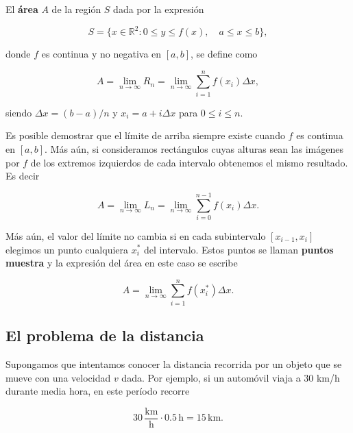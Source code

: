\documentclass[
  letterpaper,
]{book}
\theoremstyle{plain}
\theoremstyle{remark}
\begin{document}
\begin{tcolorbox}[enhanced jigsaw, opacityback=0, left=2mm, opacitybacktitle=0.6, toprule=.15mm, bottomrule=.15mm, colbacktitle=quarto-callout-note-color!10!white, titlerule=0mm, bottomtitle=1mm, title=\textcolor{quarto-callout-note-color}{\faInfo}\hspace{0.5em}{Definición (Área)}, toptitle=1mm, colframe=quarto-callout-note-color-frame, colback=white, breakable, rightrule=.15mm, arc=.35mm, leftrule=.75mm, coltitle=black]

El \textbf{área} \(A\) de la región \(S\) dada por la expresión

\[
S=\{x\in\mathbb{R}^2: 0\leq y\leq f(x),\quad a\leq x\leq b\},
\]

donde \(f\) es continua y no negativa en \([a,b]\), se define como

\[
A=\lim_{n\to \infty} R_n=\lim_{n\to \infty} \sum_{i=1}^n f(x_i)\Delta x,
\]

siendo \(\Delta x=(b-a)/n\) y \(x_i=a+i\Delta x\) para
\(0\leq i\leq n\).

\end{tcolorbox}

Es posible demostrar que el límite de arriba siempre existe cuando \(f\)
es continua en \([a,b]\). Más aún, si consideramos rectángulos cuyas
alturas sean las imágenes por \(f\) de los extremos izquierdos de cada
intervalo obtenemos el mismo resultado. Es decir

\[
A=\lim_{n\to \infty} L_n=\lim_{n\to \infty} \sum_{i=0}^{n-1} f(x_i)\Delta x.
\]

Más aún, el valor del límite no cambia si en cada subintervalo
\([x_{i-1},x_i]\) elegimos un punto cualquiera \(x_i^*\) del intervalo.
Estos puntos se llaman \textbf{puntos muestra} y la expresión del área
en este caso se escribe

\[
A=\lim_{n\to \infty} \sum_{i=1}^{n} f(x_i^*)\Delta x.
\]

\subsection{El problema de la
distancia}\label{el-problema-de-la-distancia}

Supongamos que intentamos conocer la distancia recorrida por un objeto
que se mueve con una velocidad \(v\) dada. Por ejemplo, si un automóvil
viaja a \(30\) km/h durante media hora, en este período recorre

\[
30 \,\frac{\mathrm{km}}{\mathrm{h}} \cdot 0.5\, \mathrm{h}  = 15\,\mathrm{km}. 
\]
\end{document}
